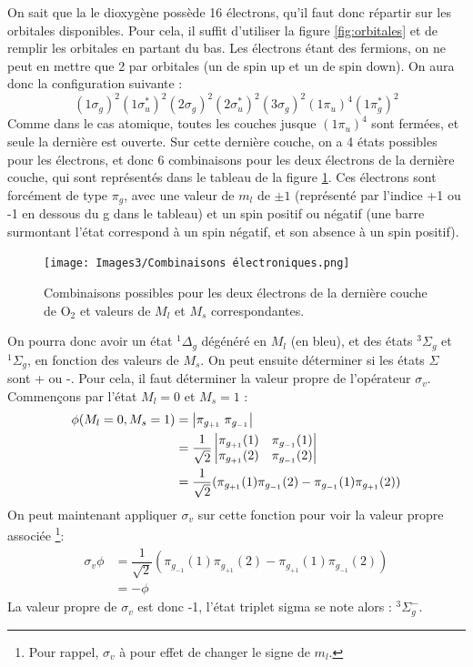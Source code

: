 On sait que la le dioxygène possède 16 électrons, qu'il faut donc répartir sur les orbitales disponibles. Pour cela, il suffit d'utiliser la figure \ref{fig:orbitales} et de remplir les orbitales en partant du bas. Les électrons étant des fermions, on ne peut en mettre que 2 par orbitales (un de spin up et un de spin down). On aura donc la configuration suivante :
\[
(1\sigma_g)^2(1\sigma^*_u)^2(2\sigma_g)^2(2\sigma^*_u)^2(3\sigma_g)^2(1\pi_u)^4(1\pi^*_g)^2
\]
Comme dans le cas atomique, toutes les couches jusque $(1\pi_u)^4$ sont fermées, et seule la dernière est ouverte. Sur cette dernière couche, on a 4 états possibles pour les électrons, et donc 6 combinaisons pour les deux électrons de la dernière couche, qui sont représentés dans le tableau de la figure \ref{fig:Combinaisons}. Ces électrons sont forcément de type $\pi_g$, avec une valeur de $m_l$ de $\pm1$ (représenté par l'indice +1 ou -1 en dessous du g dans le tableau) et un spin positif ou négatif (une barre surmontant l'état correspond à un spin négatif, et son absence à un spin positif).


\begin{figure}
\centering
\texttt{[image: Images3/Combinaisons électroniques.png]}
\caption{Combinaisons possibles pour les deux électrons de la dernière couche de O$_2$ et valeurs de $M_l$ et $M_s$ correspondantes.}
\label{fig:Combinaisons}
\end{figure}
On pourra donc avoir un état $^1\Delta_g$ dégénéré en $M_l$ (en bleu), et des états $^3\Sigma_g$ et $^1\Sigma_g$, en fonction des valeurs de $M_s$. On peut ensuite déterminer si les états $\Sigma$ sont + ou -. Pour cela, il faut déterminer la valeur propre de l'opérateur $\sigma_v$. Commençons par l'état $M_l = 0$ et $M_s=1$ :
\begin{align*}
    \phi(M_l=0, M_s=1) &= \abs{\pi_{g_{+1}}\;\pi_{g_{-1}}}\\
    &= \dfrac{1}{\sqrt{2}}
    \begin{vmatrix}
        \pi_{g_{+1}}(1) & \pi_{g_{-1}}(1)\\
        \pi_{g_{+1}}(2) & \pi_{g_{-1}}(2)\\
    \end{vmatrix}\\
    &= \dfrac{1}{\sqrt{2}}(\pi_{g_{+1}}(1)\pi_{g_{-1}}(2)-\pi_{g_{-1}}(1)\pi_{g_{+1}}(2))\\
\end{align*}
On peut maintenant appliquer $\sigma_v$ sur cette fonction pour voir la valeur propre associée \footnote{Pour rappel, $\sigma_v$ à pour effet de changer le signe de $m_l$.}:
\begin{align*}
    \sigma_v\phi &= \dfrac{1}{\sqrt{2}}(\pi_{g_{-1}}(1)\pi_{g_{+1}}(2)-\pi_{g_{+1}}(1)\pi_{g_{-1}}(2))\\
    &= -\phi
\end{align*}
La valeur propre de $\sigma_v$ est donc -1, l'état triplet sigma se note alors : $^3\Sigma_g^-$.


